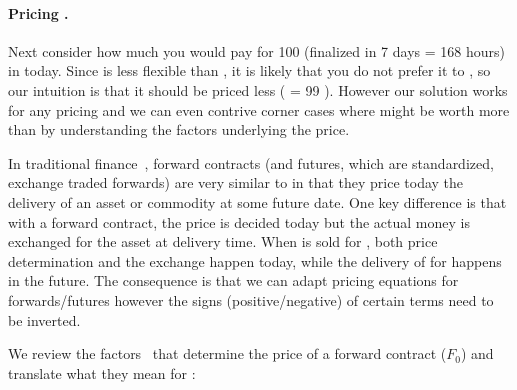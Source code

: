 
\paragraph{Pricing \ethxx.}

Next consider how much you would pay for 100 \ethxx (finalized in 7 days = 168 hours) in \ethone today. Since \ethxx is less flexible than \ethone, it is likely that you do not prefer it to \ethone, so our intuition is that it should be priced less ( \ethxx = 99 \ethone). However our solution works for any pricing and we can even contrive corner cases where \ethxx might be worth more than \ethone by understanding the factors underlying the price. 

In traditional finance~\cite{Hull}, forward contracts (and futures, which are standardized, exchange traded forwards) are very similar to \ethxx in that they price today the delivery of an asset or commodity at some future date. One key difference is that with a forward contract, the price is decided today but the actual money is exchanged for the asset at delivery time. When \ethxx is sold for \ethone, both price determination and the exchange happen today, while the delivery of \ethone for \ethxx happens in the future. The consequence is that we can adapt pricing equations for forwards/futures however the signs (positive/negative) of certain terms need to be inverted. 

We review the factors~\cite{Hull} that determine the price of a forward contract ($F_0$) and translate what they mean for \ethxx:

